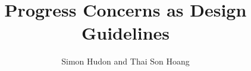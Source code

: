 \newcommand\PREAMBLE{}
{
  \usepackage{fullpage}
  \usepackage{pgf}
  \usepackage{hyperref}
}

{
}

\usepackage[english]{babel}

\usepackage[latin1]{inputenc}
\usepackage{times}
\usepackage[T1]{fontenc}

\usepackage{amsmath}
\usepackage{amssymb}
\usepackage[colour,nobox]{eventB}
\usepackage{bsymb}
\usepackage{spacing}
\usepackage{unitb}
\usepackage{unity}
\usepackage{ltl}
\usepackage[compact]{reqdoc}
\usepackage{reasoning}
\usepackage{tikz}
\usetikzlibrary{snakes,arrows}

\newcommand{\Conv}[2]{\vdash \textsf{$#1$ is convergent in $#2$}}
\newcommand{\Div}[2]{\vdash \textsf{$#1$ is divergent in $#2$}}
\newcommand{\DLF}[2]{\vdash \textsf{$#1$ is deadlock-free in $#2$}}
\newcommand{\LeadsFrom}[3]{\vdash \textsf{$#1$ leads from $#2$ to $#3$}}
\newcommand{\Pred}{P}
\newcommand{\Mch}{\Bmch{M}}

\title[The Unit-B Modelling Method]
{Progress Concerns as Design Guidelines}


\author[S.~Hudon and T.S.~Hoang] %
{Simon Hudon and Thai Son Hoang}

